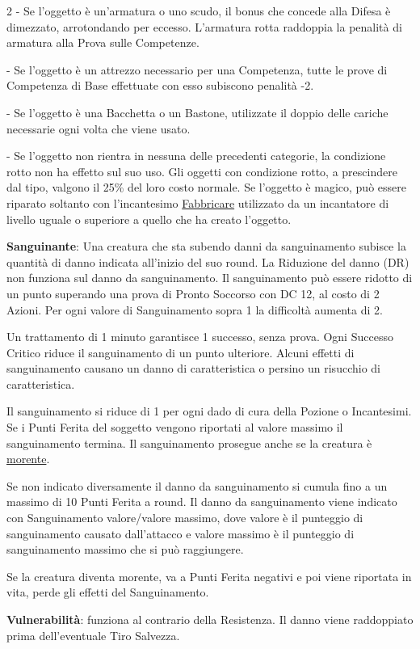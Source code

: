 \begin{multicols}{2}
- Se l'oggetto è un'armatura o uno scudo, il bonus che concede alla Difesa è dimezzato, arrotondando per eccesso. L'armatura rotta raddoppia la penalità di armatura alla Prova sulle Competenze.

- Se l'oggetto è un attrezzo necessario per una Competenza, tutte le prove di Competenza di Base effettuate con esso subiscono penalità -2.

- Se l'oggetto è una Bacchetta o un Bastone, utilizzate il doppio delle cariche necessarie ogni volta che viene usato.

- Se l'oggetto non rientra in nessuna delle precedenti categorie, la condizione rotto non ha effetto sul suo uso. Gli oggetti con condizione rotto, a prescindere dal tipo, valgono il 25\% del loro costo normale. Se l'oggetto è magico, può essere riparato soltanto con l'incantesimo \hyperlink{Fabbricare}{Fabbricare} utilizzato da un incantatore di livello uguale o superiore a quello che ha creato l'oggetto.

\textbf{Sanguinante}\hypertarget{sanguinamento}{}: Una creatura che sta subendo danni da sanguinamento subisce la quantità di danno indicata all'inizio del suo round. La Riduzione del danno (DR) non funziona sul danno da sanguinamento. Il sanguinamento può essere ridotto di un punto superando una prova di Pronto Soccorso con DC 12, al costo di 2 Azioni.
Per ogni valore di Sanguinamento sopra 1 la difficoltà aumenta di 2.

Un trattamento di 1 minuto garantisce 1 successo, senza prova. Ogni Successo Critico riduce il sanguinamento di un punto ulteriore. Alcuni effetti di sanguinamento causano un danno di caratteristica o persino un risucchio di caratteristica.

Il sanguinamento si riduce di 1 per ogni dado di cura della Pozione o Incantesimi. Se i Punti Ferita del soggetto vengono riportati al valore massimo il sanguinamento termina. Il sanguinamento prosegue anche se la creatura è \hyperlink{morente}{morente}.

Se non indicato diversamente il danno da sanguinamento si cumula fino a un massimo di 10 Punti Ferita a round. Il danno da sanguinamento viene indicato con Sanguinamento valore/valore massimo, dove valore è il punteggio di sanguinamento causato dall'attacco e valore massimo è il punteggio di sanguinamento massimo che si può raggiungere.

Se la creatura diventa morente, va a Punti Ferita negativi e poi viene riportata in vita, perde gli effetti del Sanguinamento.

\textbf{Vulnerabilità}: funziona al contrario della Resistenza. Il danno viene raddoppiato prima dell'eventuale Tiro Salvezza.

\end{multicols}

